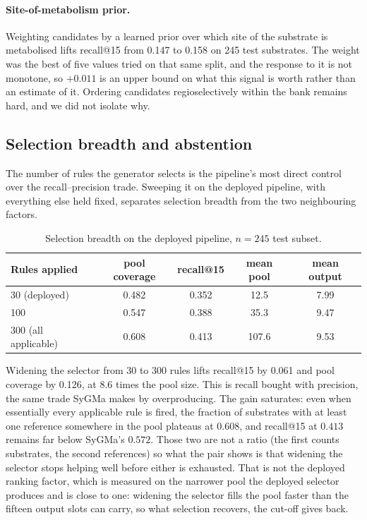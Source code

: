 \paragraph{Site-of-metabolism prior.}
Weighting candidates by a learned prior over which site of the substrate is metabolised lifts
recall@15 from 0.147 to 0.158 on 245 test substrates. The weight was the best of five values tried
on that same split, and the response to it is not monotone, so $+0.011$ is an upper bound on what
this signal is worth rather than an estimate of it. Ordering candidates regioselectively within the
bank remains hard, and we did not isolate why.

\subsection{Selection breadth and abstention}

The number of rules the generator selects is the pipeline's most direct control over the
recall--precision trade. Sweeping it on the deployed pipeline, with everything else held fixed,
separates selection breadth from the two neighbouring factors.

\begin{table}[h]
\centering
\begin{tabular}{lcccc}
\toprule
Rules applied & pool coverage & recall@15 & mean pool & mean output \\
\midrule
30 (deployed) & 0.482 & 0.352 & 12.5 & 7.99 \\
100 & 0.547 & 0.388 & 35.3 & 9.47 \\
300 (all applicable) & 0.608 & 0.413 & 107.6 & 9.53 \\
\bottomrule
\end{tabular}
\caption{Selection breadth on the deployed pipeline, $n=245$ test subset.}
\label{tab:selection-breadth}
\end{table}

Widening the selector from 30 to 300 rules lifts recall@15 by 0.061 and pool coverage by 0.126,
at 8.6 times the pool size. This is recall bought with precision, the same trade SyGMa makes by
overproducing. The gain saturates: even when essentially every applicable rule is
fired, the fraction of substrates with at least one reference somewhere in the pool plateaus at
$0.608$, and recall@15 at $0.413$ remains far below SyGMa's $0.572$. Those two are not a ratio (the first counts substrates, the second references) so what the pair shows is that widening the
selector stops helping well before either is exhausted.
That is not the deployed ranking factor, which is measured on the narrower pool the deployed
selector produces and is close to one: widening the selector fills the pool faster than the
fifteen output slots can carry, so what selection recovers, the cut-off gives back.

